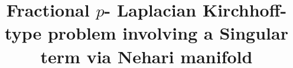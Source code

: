 \documentclass[10pt,twoside,reqno,centertags,draft]{amsart}
\begin{document}
\title{Fractional $p$- Laplacian Kirchhoff-type problem involving a Singular term via Nehari manifold}{}
\date{}
\maketitle
{}
\allowdisplaybreaks
\newtheorem{theorem}{Theorem}[section]
\newtheorem{proposition}{Proposition}[section]
 \newtheorem{gindextheorem}{General Index Theorem}[section]
\newtheorem{indextheorem} {Index Theorem}[section]
\newtheorem{standardbasis}{Standard Basis}[section]
\newtheorem{generators} {Generators}[section]
\newtheorem{lemma} {Lemma}[section]
\newtheorem{corollary}{Corollary}[section]
\newtheorem{example}{Example}[section]
\newtheorem{examples}{Examples}[section]
\newtheorem{exercise}{Exercise}[section]
\newtheorem{remark}{Remark}[section]
\newtheorem{remarks}{Remarks}[section]
\newtheorem{definition} {{Definition}}[section]
\newtheorem{definitions}{Definitions}[section]
\newtheorem{notation}{Notation}[section]
\newtheorem{notations}{Notations}[section]
\newtheorem{defnot}{Definitions and Notations}[section]


\def\H{{\mathbb H}}
\def\N{{\mathbb N}}
\def\R{{\mathbb R}}


\newcommand{\be} {\begin{equation}}
\newcommand{\ee} {\end{equation}}
\newcommand{\bea} {\begin{eqnarray}}
\newcommand{\eea} {\end{eqnarray}}
\newcommand{\Bea} {\begin{eqnarray*}}
\newcommand{\Eea} {\end{eqnarray*}}
\newcommand{\p} {\partial}
\newcommand{\ov} {\over}
\newcommand{\al} {\alpha}
\newcommand{\ba} {\beta}
\newcommand{\de} {\delta}
\newcommand{\ga} {\gamma}
\newcommand{\Ga} {\Gamma}
\newcommand{\Om} {\Omega}
\newcommand{\om} {\omega}
\newcommand{\De} {\Delta}
\newcommand{\la} {\lambda}
\newcommand{\si} {\sigma}
\newcommand{\Si} {\Sigma}
\newcommand{\La} {\Lambda}
\newcommand{\no} {\nonumber}
\newcommand{\noi} {\noindent}
\newcommand{\lab} {\label}
\newcommand{\na} {\nabla}
\newcommand{\vp} {\varphi}
\newcommand{\var} {\varepsilon}
\newcommand{\RR}{{\mathbb R}}
\newcommand{\CC}{{\mathbb C}}
\newcommand{\NN}{{\mathbb N}}
\newcommand{\ZZ}{{\mathbb Z}}
\renewcommand{\SS}{{\mathbb S}}
\newcommand{\esssup}{\mathop{\rm {ess\,sup}}\limits}   %
\newcommand{\essinf}{\mathop{\rm {ess\,inf}}\limits}   %
\newcommand{\weaklim}{\mathop{\rm {weak-lim}}\limits}
\newcommand{\wstarlim}{\mathop{\rm {weak^\ast-lim}}\limits}
\end{document}

